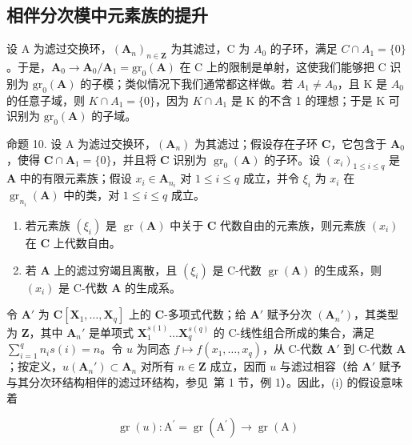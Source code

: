 \subsection{相伴分次模中元素族的提升}

设 A 为滤过交换环，\((\mathbf{A}_{n})_{n\in\mathbf{Z}}\) 为其滤过，C 为 \(A_{0}\) 的子环，满足 \(C\cap A_{1}=\{0\}\)。于是，\(\mathbf{A}_{0}\to\mathbf{A}_{0}/\mathbf{A}_{1}=\mathrm{gr}_{0}(\mathbf{A})\) 在 C 上的限制是单射，这使我们能够把 C 识别为 \(\mathrm{gr}_{0}(\mathbf{A})\) 的子模；类似情况下我们通常都这样做。若 \(A_{1}\neq A_{0}\)，且 K 是 \(A_{0}\) 的任意子域，则 \(K\cap A_{1}=\{0\}\)，因为 \(K\cap A_{1}\) 是 K 的不含 1 的理想；于是 K 可识别为 \(\mathrm{gr}_{0}(\mathbf{A})\) 的子域。

	命题 10. 设 A 为滤过交换环，\((\mathbf{A}_n)\) 为其滤过；假设存在子环 \(\mathbf{C}\)，它包含于 \(\mathbf{A}_0\)，使得 \(\mathbf{C} \cap \mathbf{A}_1 = \{0\}\)，并且将 \(\mathbf{C}\) 识别为 \(\operatorname{gr}_0(\mathbf{A})\) 的子环。设 \((x_i)_{1 \leqslant i \leqslant q}\) 是 \(\mathbf{A}\) 中的有限元素族；假设 \(x_i \in \mathbf{A}_{n_i}\) 对 \(1 \leqslant i \leqslant q\) 成立，并令 \(\xi_i\) 为 \(x_i\) 在 \(\operatorname{gr}_{n_i}(\mathbf{A})\) 中的类，对 \(1 \leqslant i \leqslant q\) 成立。

\begin{enumerate}
\def\labelenumi{(\roman{enumi})}
\item
	  若元素族 \((\xi_{i})\) 是 \(\operatorname{gr}(\mathbf{A})\) 中关于 \(\mathbf{C}\) 代数自由的元素族，则元素族 \((x_{i})\) 在 \(\mathbf{C}\) 上代数自由。
\item
  若 \(\mathbf{A}\) 上的滤过穷竭且离散，且 \((\xi_{i})\) 是 C-代数 \(\operatorname{gr}(\mathbf{A})\) 的生成系，则 \((x_{i})\) 是 C-代数 \(\mathbf{A}\) 的生成系。
\end{enumerate}

	令 \(\mathbf{A}'\) 为 \(\mathbf{C}[\mathbf{X}_1, \ldots, \mathbf{X}_q]\) 上的 \(\mathbf{C}\)-多项式代数；给 \(\mathbf{A}'\) 赋予分次 \((\mathbf{A}_n')\)，其类型为 \(\mathbf{Z}\)，其中 \(\mathbf{A}_n'\) 是单项式 \(\mathbf{X}_1^{s(1)} \ldots \mathbf{X}_q^{s(q)}\) 的 C-线性组合所成的集合，满足 \(\sum_{i=1}^{q} n_i s(i) = n\)。令 \(u\) 为同态 \(f \mapsto f(x_1, \ldots, x_q)\)，从 C-代数 \(\mathbf{A}'\) 到 C-代数 \(\mathbf{A}\)；按定义，\(u(\mathbf{A}_n') \subset \mathbf{A}_n\) 对所有 \(n \in \mathbf{Z}\) 成立，因而 \(u\) 与滤过相容（给 \(\mathbf{A}'\) 赋予与其分次环结构相伴的滤过环结构，参见~第 1 节，例 1）。因此，(i) 的假设意味着

\[
\operatorname{gr} (u): \mathrm{A} ^ {\prime} = \operatorname{gr} (\mathrm{A} ^ {\prime}) \rightarrow \operatorname{gr} (\mathrm{A})
\]

